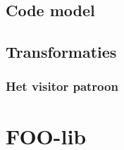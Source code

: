 \subsection{Code model}
\label{subsection:devel-code-model}

\TODO

\subsection{Transformaties}
\label{subsection:transformations}

\TODO

\subsubsection{Het visitor patroon}
\label{subsubsection:devel-visitor-pattern}

\TODO

\section{FOO-lib}
\label{section:devel-foo-lib}

\TODO
